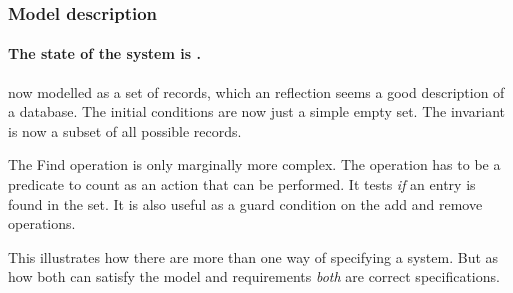 \documentclass[12pt]{article}
\begin{document}
\subsubsection{Model description} 
\paragraph{The state of the system is .} now modelled as a set of records,
which an reflection seems a good description of a database.
The initial conditions are now just a simple empty set.
The invariant is now a subset of all possible records.

The Find operation is only marginally more complex.  The operation has to be a
predicate to count as an action that can be performed.  It tests \emph{if} an
entry is found in the set.  It is also useful as a guard condition on the add
and remove operations.

\begin{infobox}{\info}
This illustrates how there are more than one way of specifying a system.  But
as how both can satisfy the model and requirements \emph{both} are correct
specifications.
\end{infobox}
\end{document}
